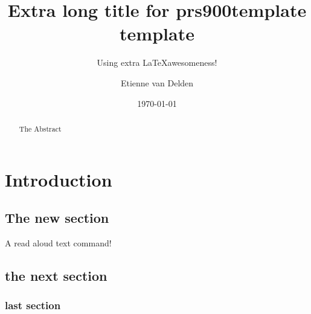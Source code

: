 \documentclass[9pt]{memoir}
\begin{document}
	
    
    \renewcommand{\contentsname}{Table of Contents} %
    
	\title{Extra long title for prs900template template}
    \subtitle{Using extra \LaTeX awesomeness!}
	\author{Etienne van Delden}
	\date{\today}
    
    
   	\maketitle
    \thispagestyle{empty}
    
    \begin{figure}[b]
        \begin{abstract}
            The Abstract
        \end{abstract}
    \end{figure}

    \newpage
   \setcounter{tocdepth}{1}
    \tableofcontents*
    
    
        
	\mainmatter
	\chapter{Introduction}
	
        \section{The new section}\noindent    
        A read aloud text command!
         \lipsum[2-2]
        \section{the next section}
            \lipsum[3-4]
        \subsection{last section}
            \lipsum[4-5]
	
\end{document}
